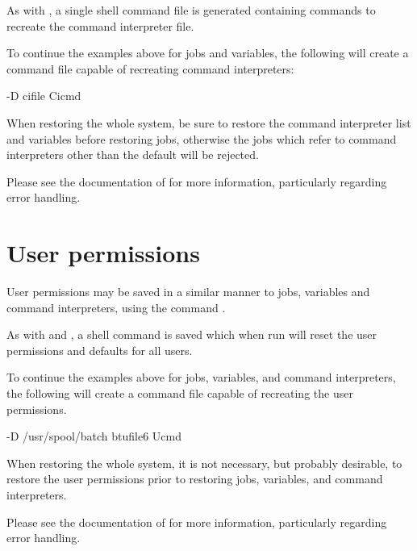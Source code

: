 As with \PrXbCvlist, a single shell command file is generated containing commands to recreate the command interpreter file.

To continue the examples above for jobs and variables, the following will create a command file capable of recreating command interpreters:

\begin{expara}

\XbCiconvName{} -D \spooldirname{} cifile Cicmd

\end{expara}

When restoring the whole system, be sure to restore the command interpreter list and variables before restoring jobs, otherwise the
jobs which refer to command interpreters other than the default will be rejected.

Please see the documentation of \PrXbCiconv{} for more information, particularly regarding error handling.

\section{User permissions}
User permissions may be saved in a similar manner to jobs, variables and command interpreters, using the command
\PrXbBtuconv.

As with \PrXbCvlist{} and \PrXbCiconv{}, a shell command is saved which when run will reset the user permissions and defaults for all
users.

To continue the examples above for jobs, variables, and command interpreters, the following will create a command file capable of
recreating the user permissions.

\begin{expara}

\XbBtuconvName{} -D /usr/spool/batch btufile6 Ucmd

\end{expara}

When restoring the whole system, it is not necessary, but probably desirable, to restore the user permissions prior to restoring jobs,
variables, and command interpreters.

Please see the documentation of \PrXbBtuconv{} for more information, particularly regarding error handling.

